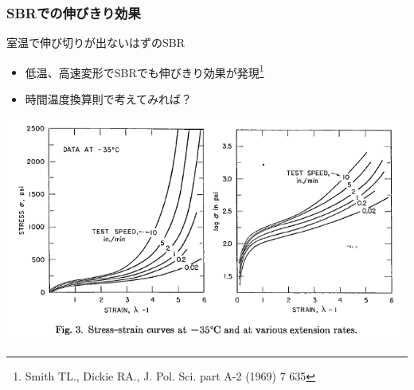 \documentclass[12pt, dvipdfmx]{beamer}
\begin{document}
\begin{frame}
	\frametitle{SBRでの伸びきり効果}
		\begin{alertblock}{室温で伸び切りが出ないはずのSBR}
			\begin{itemize}
				\item \alert{低温、高速変形}でSBRでも伸びきり効果が発現\footnote{
					{\footnotesize Smith TL., Dickie RA., J. Pol. Sci. part A-2 (1969) 7 635}
				}
				\item 時間温度換算則で考えてみれば？
			\end{itemize}

			\centering
			\includegraphics[width=.6\textwidth]{SBR_lowTemp_2.png}
		\end{alertblock}
\end{frame}
\end{document}
